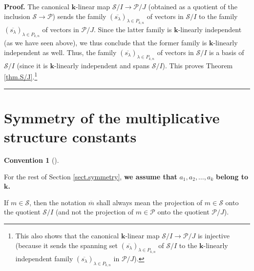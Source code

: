 \documentclass[numbers=enddot,12pt,final,onecolumn,notitlepage]{scrartcl}%
\theoremstyle{definition}
\newtheorem{conv}[theo]{Convention}
\newenvironment{convention}[1][]
{\begin{conv}[#1]\begin{leftbar}}
{\end{leftbar}\end{conv}}
\newenvironment{proof}[1][Proof]{\noindent\textbf{#1.} }{\ \rule{0.5em}{0.5em}}
\newenvironment{convention}[1][Convention]{\noindent\textbf{#1.} }{\ \rule{0.5em}{0.5em}}
\newenvironment{convention}[1][Convention]{\noindent\textbf{#1.} }{\ \rule{0.5em}{0.5em}}
\begin{document}
\begin{proof}
The canonical $\mathbf{k}$-linear map $\mathcal{S}/I\rightarrow\mathcal{P}/J$
(obtained as a quotient of the inclusion $\mathcal{S}\rightarrow\mathcal{P}$)
sends the family $\left(  \overline{s_{\lambda}}\right)  _{\lambda\in P_{k,n}%
}$ of vectors in $\mathcal{S}/I$ to the family $\left(  \overline{s_{\lambda}%
}\right)  _{\lambda\in P_{k,n}}$ of vectors in $\mathcal{P}/J$. Since the
latter family is $\mathbf{k}$-linearly independent (as we have seen above), we
thus conclude that the former family is $\mathbf{k}$-linearly independent as
well. Thus, the family $\left(  \overline{s_{\lambda}}\right)  _{\lambda\in
P_{k,n}}$ of vectors in $\mathcal{S}/I$ is a basis of $\mathcal{S}/I$ (since
it is $\mathbf{k}$-linearly independent and spans $\mathcal{S}/I$). This
proves Theorem \ref{thm.S/J}.\footnote{This also shows that the canonical
$\mathbf{k}$-linear map $\mathcal{S}/I\rightarrow\mathcal{P}/J$ is injective
(because it sends the spanning set $\left(  \overline{s_{\lambda}}\right)
_{\lambda\in P_{k,n}}$ of $\mathcal{S}/I$ to the $\mathbf{k}$-linearly
independent family $\left(  \overline{s_{\lambda}}\right)  _{\lambda\in
P_{k,n}}$ in $\mathcal{P}/J$).}
\end{proof}


\section{\label{sect.symmetry}Symmetry of the multiplicative structure
constants}

\begin{convention}
\label{conv.symmetry-conv}For the rest of Section \ref{sect.symmetry},
\textbf{we assume that }$a_{1},a_{2},\ldots,a_{k}$ \textbf{belong to
}$\mathbf{k}$\textbf{.}

If $m\in\mathcal{S}$, then the notation $\overline{m}$ shall always mean the
projection of $m\in\mathcal{S}$ onto the quotient $\mathcal{S}/I$ (and not the
projection of $m\in\mathcal{P}$ onto the quotient $\mathcal{P}/J$).
\end{convention}
\end{document}
